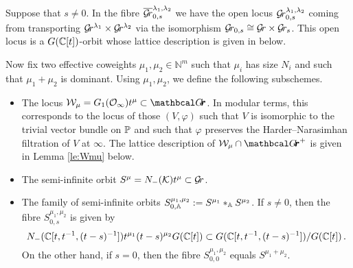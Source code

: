 \documentclass[draft]{article}
\begin{document}
\begin{itemize}
    Suppose that $ s \ne 0$.  In the fibre $\overline{\Gr}_{0,s}^{\lambda_1, \lambda_2}$ we have the open locus $ \Gr_{0,s}^{\lambda_1, \lambda_2}$ coming from transporting $ \Gr^{\lambda_1} \times \Gr^{\lambda_2} $ via the isomorphism $ \Gr_{0,s} \cong \Gr \times \Gr_s $.  This open locus is a $ G(\CC[t])$-orbit
    whose lattice description is given in  below.
\end{itemize}
Now fix two effective coweights $ \mu_1, \mu_2 \in \mathbb N^m$ such that $ \mu_i$ has size $ N_i$ and such that $ \mu_1 + \mu_2 $ is dominant.  Using $ \mu_1, \mu_2$, we define the following subschemes.

\begin{itemize}
    \item The locus $\cW_\mu = G_1(\Oinf) t^\mu \subset \Grth $.  
    In modular terms, this corresponds to the locus of those $ (V, \varphi)$ such that $ V $ is isomorphic to the trivial vector bundle on $ \PP$ and such that $ \varphi$ preserves the {Harder--Narasimhan filtration of $V$ at $ \infty$}.  The lattice description of $ \cW_\mu \cap \Grth^+$ is given in Lemma \ref{le:Wmu} below. 
    \item The semi-infinite orbit $ S^\mu = N_-(\cK)t^\mu \subset \Gr $.  
    \item The family of semi-infinite orbits $ S^{\mu_1, \mu_2}_{0,\AA} := S^{\mu_1} \ast_\AA S^{\mu_2}$.  If $ s \ne 0 $, then the fibre $S^{\mu_1, \mu_2}_{0,s} $ is given by
    $$
    N_-(\CC[t, t^{-1}, (t-s)^{-1}])t^{\mu_1} (t-s)^{\mu_2} G(\CC[t])\subset G(\CC[t,t^{-1}, (t-s)^{-1}]) / G(\CC[t]) \,. %
    $$
    On the other hand, if $ s = 0$, then the fibre $S^{\mu_1, \mu_2}_{0,0} $ equals $ S^{\mu_1 + \mu_2}$. 
    
    
\end{itemize}
\end{document}
